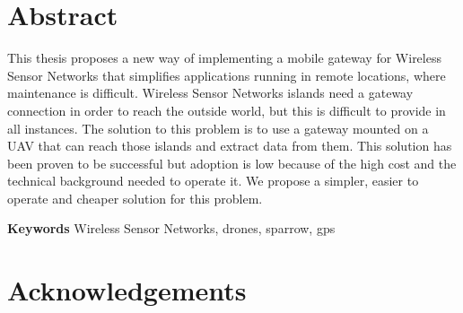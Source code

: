 \chapter*{Abstract}

This thesis proposes a new way of implementing a mobile gateway for Wireless Sensor Networks that simplifies applications running in remote locations, where maintenance is difficult. Wireless Sensor Networks islands need a gateway connection in order to reach the outside world, but this is difficult to provide in all instances. The solution to this problem is to use a gateway mounted on a UAV that can reach those islands and extract data from them.
This solution has been proven to be successful but adoption is low because of the high cost and the technical background needed to operate it. We propose a simpler, easier to operate and cheaper solution for this problem.





\textbf{Keywords} Wireless Sensor Networks, drones, sparrow, gps

\chapter*{Acknowledgements}

 



